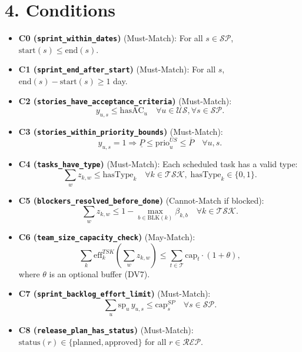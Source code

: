 \documentclass[11pt,a4paper]{article}
\begin{document}
\section{4. Conditions}
\begin{itemize}[leftmargin=1.2em]
  \item \textbf{C0 (\texttt{sprint\_within\_dates})} (Must-Match): For all $s\in\mathcal{SP}$, $\mathrm{start}(s) \le \mathrm{end}(s)$.

  \item \textbf{C1 (\texttt{sprint\_end\_after\_start})} (Must-Match): For all $s$, $\mathrm{end}(s) - \mathrm{start}(s) \ge 1$ day.

  \item \textbf{C2 (\texttt{stories\_have\_acceptance\_criteria})} (Must-Match):
  \[
    y_{u,s} \le \mathrm{hasAC}_u \quad \forall u\in\mathcal{US}, \forall s\in\mathcal{SP}.
  \]

  \item \textbf{C3 (\texttt{stories\_within\_priority\_bounds})} (Must-Match):
  \[
    y_{u,s}=1 \Rightarrow \underline{P} \le \mathrm{prio}^{US}_u \le \overline{P} \quad \forall u,s.
  \]

  \item \textbf{C4 (\texttt{tasks\_have\_type})} (Must-Match): Each scheduled task has a valid type:
  \[
    \sum_{w} z_{k,w} \le \mathrm{hasType}_k \quad \forall k\in\mathcal{TSK}, \; \mathrm{hasType}_k \in \{0,1\}.
  \]

  \item \textbf{C5 (\texttt{blockers\_resolved\_before\_done})} (Cannot-Match if blocked):
  \[
    \sum_{w} z_{k,w} \le 1 - \max_{b \in \mathrm{BLK}(k)} \beta_{k,b} \quad \forall k \in \mathcal{TSK}.
  \]

  \item \textbf{C6 (\texttt{team\_size\_capacity\_check})} (May-Match):
  \[
    \sum_{k} \mathrm{eff}^{TSK}_k \left(\sum_{w} z_{k,w}\right) \le \sum_{t \in \mathcal{T}} \mathrm{cap}_t \cdot (1+\theta),
  \]
  where $\theta$ is an optional buffer (DV7).

  \item \textbf{C7 (\texttt{sprint\_backlog\_effort\_limit})} (Must-Match):
  \[
    \sum_{u} \mathrm{sp}_u \, y_{u,s} \le \mathrm{cap}^{SP}_s \quad \forall s \in \mathcal{SP}.
  \]

  \item \textbf{C8 (\texttt{release\_plan\_has\_status})} (Must-Match): $\mathrm{status}(r) \in \{\text{planned},\text{approved}\}$ for all $r\in\mathcal{REP}$.


\end{itemize}
\end{document}
